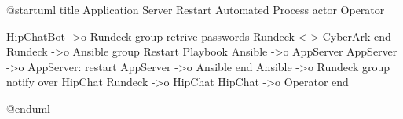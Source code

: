 @startuml
title Application Server Restart Automated Process
actor Operator

HipChatBot ->o Rundeck
group retrive passwords
  Rundeck <-> CyberArk
end
Rundeck ->o Ansible
group Restart Playbook
  Ansible ->o AppServer
  AppServer ->o AppServer: restart
  AppServer ->o Ansible
end
Ansible ->o Rundeck
group notify over HipChat
  Rundeck ->o HipChat
  HipChat ->o Operator
end


@enduml
